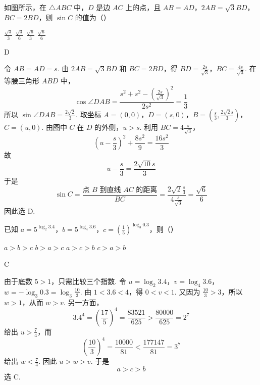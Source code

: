 \begin{problem}
如图所示，在 \(\triangle ABC\) 中，\(D\) 是边 \(AC\) 上的点，且 \(AB = AD\)，\(2AB = \sqrt{3}BD\)，\(BC = 2BD\)，则 \(\sin C\) 的值为（\quad）


\choices
    {\(\frac{\sqrt{3}}{3}\)}
    {\(\frac{\sqrt{3}}{6}\)}
    {\(\frac{\sqrt{6}}{3}\)}
    {\(\frac{\sqrt{6}}{6}\)}
\begin{answer}
D
\end{answer}

\begin{solution}
令 \(AB=AD=s\). 由 \(2AB=\sqrt{3}BD\) 和 \(BC=2BD\)，得
\(BD=\frac{2s}{\sqrt{3}}\)，\(BC=\frac{4s}{\sqrt{3}}\).
在等腰三角形 \(ABD\) 中，
\[
\cos\angle DAB
=\frac{s^2+s^2-\left(\frac{2s}{\sqrt3}\right)^2}{2s^2}
=\frac13
\]
所以 \(\sin\angle DAB=\frac{2\sqrt2}{3}\). 取坐标
\(A=(0,0)\)，\(D=(s,0)\)，\(B=\left(\frac{s}{3},\frac{2\sqrt2s}{3}\right)\)，\(C=(u,0)\).
由图中 \(C\) 在 \(D\) 的外侧，\(u>s\). 利用 \(BC=4\frac{s}{\sqrt3}\)，
\[
\left(u-\frac{s}{3}\right)^2+\frac{8s^2}{9}
=\frac{16s^2}{3}
\]
故
\[
u-\frac{s}{3}=\frac{2\sqrt{10}s}{3}
\]
于是
\[
\sin C
=\frac{\text{点 }B\text{ 到直线 }AC\text{ 的距离}}{BC}
=\frac{2\sqrt2\frac{s}{3}}{4\frac{s}{\sqrt3}}
=\frac{\sqrt6}{6}
\]
因此选 D.
\end{solution}
\end{problem}

\begin{problem}
已知 \(a = 5^{\log_{2} 3.4}\)，\(b = 5^{\log_{4} 3.6}\)，\(c = \left(\frac{1}{5}\right)^{\log_{3} 0.3}\)，则（\quad）

\choices
    {\(a > b > c\)}
    {\(b > a > c\)}
    {\(a > c > b\)}
    {\(c > a > b\)}
\begin{answer}
C
\end{answer}

\begin{solution}
由于底数 \(5>1\)，只需比较三个指数. 令
\(u=\log_2 3.4\)，\(v=\log_4 3.6\)，\(w=-\log_3 0.3=\log_3\frac{10}{3}\).
由 \(1<3.6<4\)，得 \(0<v<1\). 又因为 \(\frac{10}{3}>3\)，所以 \(w>1\)，从而 \(w>v\).
另一方面，
\[
3.4^4=\left(\frac{17}{5}\right)^4=\frac{83521}{625}
>\frac{80000}{625}=2^7
\]
给出 \(u>\frac74\)，而
\[
\left(\frac{10}{3}\right)^4=\frac{10000}{81}
<\frac{177147}{81}=3^7
\]
给出 \(w<\frac74\). 因此 \(u>w>v\). 于是
\[
a>c>b
\]
选 C.
\end{solution}
\end{problem}

